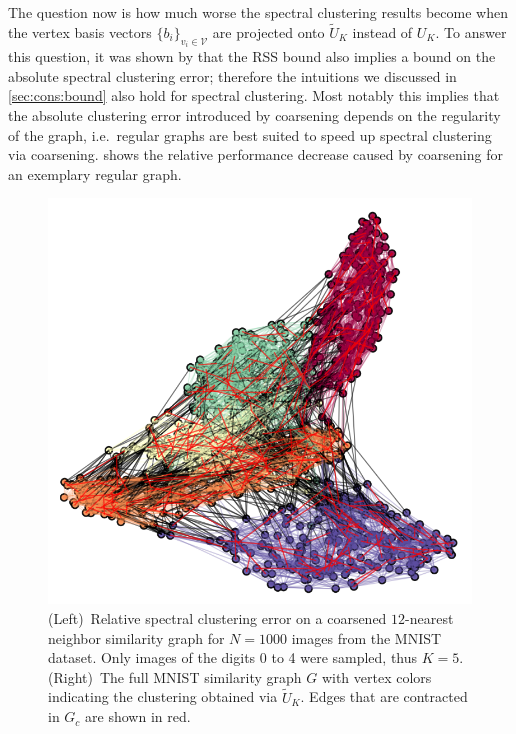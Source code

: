 The question now is how much worse the spectral clustering results become when the vertex basis vectors ${\{ b_i \}}_{v_i \in \mathcal{V}}$ are projected onto $\widetilde{U}_K$ instead of $U_K$.
To answer this question, it was shown by \citet[Coroll.~5.1]{Loukas2018} that the RSS bound also implies a bound on the absolute spectral clustering error;
therefore the intuitions we discussed in \cref{sec:cons:bound} also hold for spectral clustering.
Most notably this implies that the absolute clustering error introduced by coarsening depends on the regularity of the graph, i.e.\ regular graphs are best suited to speed up spectral clustering via coarsening.
 shows the relative performance decrease caused by coarsening for an exemplary regular graph.
\begin{figure}[ht]
	\centering
	\quad\includegraphics[width=0.29\linewidth]{gfx/cons/mnistGraph.png}
	\caption{%
		(Left)~Relative spectral clustering error on a coarsened $12$-nearest neighbor similarity graph for $N=1000$ images from the MNIST dataset.
		Only images of the digits 0 to 4 were sampled, thus $K = 5$.
		(Right)~The full MNIST similarity graph $G$ with vertex colors indicating the clustering obtained via $\widetilde{U}_K$. Edges that are contracted in $G_c$ are shown in red.
	}\label{fig:cons:mnist}
\end{figure}
\vspace{-0.7cm}
